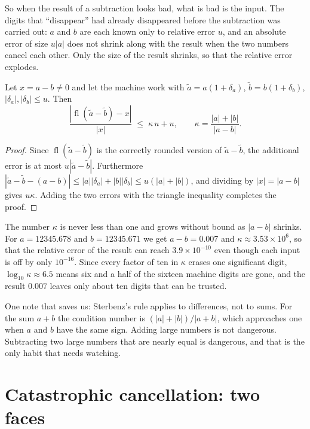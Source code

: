 So when the result of a subtraction looks bad, what is bad is the input. The digits that
``disappear'' had already disappeared before the subtraction was carried out: $a$ and $b$
are each known only to relative error $u$, and an absolute error of size $u|a|$ does not
shrink along with the result when the two numbers cancel each other. Only the size of the
result shrinks, so that the relative error explodes.

\begin{proposisi}
Let $x=a-b\neq0$ and let the machine work with $\tilde{a}=a(1+\delta_{a})$,
$\tilde{b}=b(1+\delta_{b})$, $|\delta_{a}|,|\delta_{b}|\le u$. Then
\[
  \frac{|\operatorname{fl}(\tilde{a}-\tilde{b})-x|}{|x|}
  \;\le\;\kappa\,u+u,
  \qquad \kappa=\frac{|a|+|b|}{|a-b|}.
\]
\end{proposisi}

\begin{proof}
Since $\operatorname{fl}(\tilde{a}-\tilde{b})$ is the correctly rounded version of
$\tilde{a}-\tilde{b}$, the additional error is at most $u|\tilde{a}-\tilde{b}|$.
Furthermore
$|\tilde{a}-\tilde{b}-(a-b)|\le|a||\delta_{a}|+|b||\delta_{b}|\le u(|a|+|b|)$,
and dividing by $|x|=|a-b|$ gives $u\kappa$. Adding the two errors with the
triangle inequality completes the proof.
\end{proof}

The number $\kappa$ is never less than one and grows without bound as
$|a-b|$ shrinks. For $a=12345.678$ and $b=12345.671$ we get $a-b=0.007$
and $\kappa\approx3.53\times10^{6}$, so that the relative error of the result can reach
$3.9\times10^{-10}$ even though each input is off by only $10^{-16}$. Since every
factor of ten in $\kappa$ erases one significant digit,
$\log_{10}\kappa\approx6.5$ means six and a half of the sixteen machine digits are gone,
and the result $0.007$ leaves only about ten digits that can be trusted.

One note that saves us: Sterbenz's rule applies to differences, not to
sums. For the sum $a+b$ the condition number is
$(|a|+|b|)/|a+b|$, which approaches one when $a$ and $b$ have the same sign. Adding
large numbers is not dangerous. Subtracting two large numbers that are nearly equal is
dangerous, and that is the only habit that needs watching.

\section{Catastrophic cancellation: two faces}

